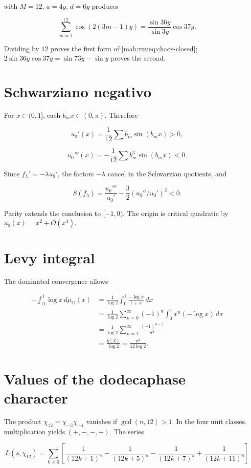 with \(M=12\), \(a=4y\), \(d=6y\) produces

\[
\sum_{m=1}^{12}\cos(2(3m-1)y)
=\frac{\sin36y}{\sin3y}\cos37y.
\]

Dividing by \(12\) proves the first form of \cref{mab:rm:eq:chaos-closed}; \(2\sin36y\cos37y=\sin73y-\sin y\) proves the second.

\section{Schwarziano negativo}

For \(x\in(0,1]\), each \(b_mx\in(0,\pi)\). Therefore

\[
u_0'(x)=\frac1{12}\sum b_m\sin(b_mx)>0,
\]

\[
u_0'''(x)=-\frac1{12}\sum b_m^3\sin(b_mx)<0.
\]

Since \(f_\lambda'=-\lambda u_0'\), the factors \(-\lambda\) cancel in the Schwarzian quotients, and

\[
S(f_\lambda)=\frac{u_0'''}{u_0'}
-\frac32(u_0''/u_0')^2<0.
\]

Parity extends the conclusion to \([-1,0)\). The origin is critical quadratic by \(u_0(x)=x^2+O(x^4)\).

\section{Levy integral}

The dominated convergence allows

\begin{align*}
-\int_0^1\log x\,d\mu_G(x)
&=\frac1{\log2}\int_0^1\frac{-\log x}{1+x}\,dx\\
&=\frac1{\log2}\sum_{n=0}^\infty(-1)^n
\int_0^1x^n(-\log x)\,dx\\
&=\frac1{\log2}\sum_{n=1}^\infty\frac{(-1)^{n-1}}{n^2}\\
&=\frac{\eta(2)}{\log2}
=\frac{\pi^2}{12\log2}.
\end{align*}

\section{Values of the dodecaphase character}

The product \(\chi_{12}=\chi_{-3}\chi_{-4}\) vanishes if \(\gcd(n,12)>1\). In the four unit classes, multiplication yields \((+,-,-,+)\). The series

\[
L(s,\chi_{12})=
\sum_{k\ge0}\left[
\frac1{(12k+1)^s}-\frac1{(12k+5)^s}
-\frac1{(12k+7)^s}+\frac1{(12k+11)^s}
\right]
\]

